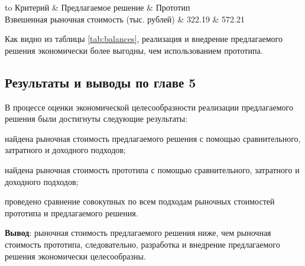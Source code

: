 \begin{table}[H]
\centering
\caption{Сравнение рыночной стоимости прототипа и предлагаемого решения}
{\small 
\begin{tabu}to \textwidth{ | X[c] | X[c] | X[c] |}
	\hline
	Критерий & Предлагаемое решение & Прототип \\ \hline
	Взвешенная рыночная стоимость (тыс. рублей) & 322.19 & 572.21 \\ \hline
\end{tabu}
}
\label{tab:balances}
\end{table} 

Как видно из таблицы \ref{tab:balances}, реализация и внедрение предлагаемого решения экономически более выгодны, чем использованием прототипа.

\subsection{Результаты и выводы по главе 5}

В процессе оценки экономической целесообразности реализации предлагаемого решения были достигнуты следующие результаты:
\begin{list}{}{\leftmargin=1.5cm}
	\item найдена рыночная стоимость предлагаемого решения с помощью сравнительного, затратного и доходного подходов;
	\item найдена рыночная стоимость прототипа с помощью сравнительного, затратного и доходного подходов;
	\item проведено сравнение совокупных по всем подходам рыночных стоимостей прототипа и предлагаемого решения.
\end{list}

\textbf{Вывод}: рыночная стоимость предлагаемого решения ниже, чем рыночная стоимость прототипа, следовательно, разработка и внедрение предлагаемого решения экономически целесообразны.